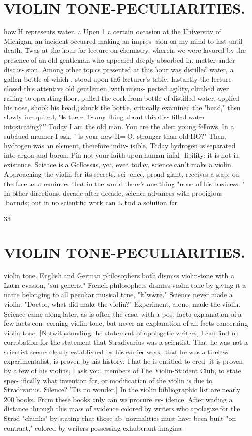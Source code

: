 \documentclass{article}
\begin{document}
\section*{VIOLIN TONE-PECULIARITIES.}
how H represents water. a Upon 1 a certain occasion at the University of Michigan, an incident occurred making an impres- sion on my mind to last until death. Twas at the hour for lecture on chemistry, wherein we were favored by the presence of an old gentleman who appeared deeply absorbed in. matter under discus- sion. Among other topics presented at this hour was distilled water, a gallon bottle of which . stood upon th6 lecturer's table. Instantly the lecture closed this attentive old gentlemen, with unsus- pected agility, climbed over railing to operating floor, pulled the cork from bottle of distilled water, applied his nose, shook his head,; shook the bottle, critically examined the "bead," then slowly in-- quired, "Is there T- any thing about this dis- tilled water intoxicating?"' Today I am the old man. You are the alert young fellows. In a subdued manner I ask, ' Is your new H= O. stronger than old HO?" Then, hydrogen was an element, therefore indiv- isible. Today hydrogen is separated into argon and boron. Pin not your faith upon human infal- libility; it is not in existence. Science is a Gollossus, yet, even today, science can't make a violin. Approaching the violin for its secrets, sci- ence, proud giant, receives a slap; on the face as a reminder that in the world there's one thing "none of his business. " In other directions, decade after decade, science advances with prodigious 'bounds; but in no scientific work can L find a solution for

33

\section*{VIOLIN TONE-PECULIARITIES.}
violin tone. English and German philosophers both dismiss violin-tone with a Latin evasion, "sui generis." French philosophers dismiss violin-tone by giving it a name belonging to all peculiar musical tone, "ft'w\&re." Science never made a violin. "Doctor, what did make the violin?" Experiment, alone, made the violin. Science came along later, as is often the case, with a post facto explanation of a few facts con- cerning violin-tone, but never an explanation of all facts concerning violin-tone. [Notwithstanding the statement of apologetic writers, I can find no corrobation for the statement that Stradivarius was a scientist. That he was not a scientist seems clearly established by his earlier work; that he was a tireless experimentalist, is proven by his history. That he is entitled to cred- it is proven by a few of his violins, I ask you, members of The Violin-Student Club, to state spec- ifically what invention for, or modification of the violin is due to Stradivarius. Silence? 'Tis no wonder.] In the violin bibliographic list are nearly 200 books. From these books only can we procure ev- idence. After wading a distance through this mass of evidence colored by writers who apologize for the Strad "chunks" by stating that those ab- normalities must have been built "on contract," colored by writers possessing exhuberant imagina-
\end{document}
